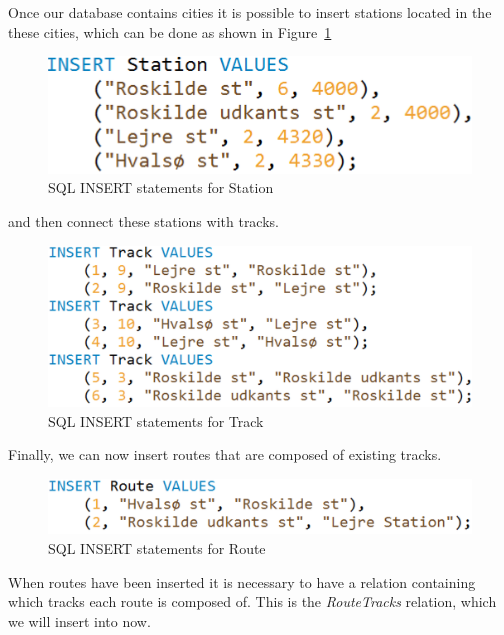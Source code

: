 Once our database contains cities it is possible to insert stations located in 
the these cities, which can be done as shown in Figure~\ref{fig:ins:station}

\begin{figure}[ht!]
    \centering
    \includegraphics[scale=.5]{img/INSERT_Statement_Station}
    \caption{SQL INSERT statements for Station}
    \label{fig:ins:station}
\end{figure}

and then connect these stations with tracks.

\begin{figure}[ht!]
    \centering
    \includegraphics[scale=.5]{img/INSERT_Statements_Track}
    \caption{SQL INSERT statements for Track}
\end{figure}

Finally, we can now insert routes that are composed of existing tracks.

\begin{figure}[ht!]
    \centering
    \includegraphics[scale=.5]{img/INSERT_Statements_Route}
    \caption{SQL INSERT statements for Route}
\end{figure}

When routes have been inserted it is necessary to have a relation containing 
which tracks each route is composed of. This is the \emph{RouteTracks} 
relation, which we will insert into now.


